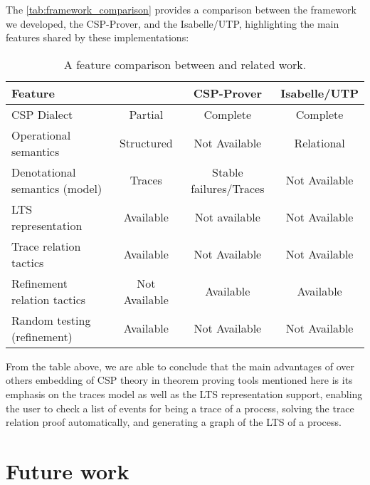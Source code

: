 The \autoref{tab:framework_comparison} provides a comparison between the framework we developed, the CSP-Prover, and the Isabelle/UTP, highlighting the main features shared by these implementations:

\begin{table}[htb]
	\begin{center}
		\caption[A feature comparison between \CSPcoq{} and related work]{A feature comparison between \CSPcoq{} and related work.}
		\label{tab:framework_comparison}
		\begin{tabular}{ |l|c|c|c| }
			\hline
			Feature & \CSPcoq{} & CSP-Prover & Isabelle/UTP \\
			\hline
			CSP Dialect & Partial & Complete & Complete \\ [0.5ex]
			Operational semantics & Structured & Not Available & Relational \\ [0.5ex]
			Denotational semantics (model) & Traces & Stable failures/Traces & Not Available \\ [0.5ex]
			LTS representation & Available & Not available & Not Available \\ [0.5ex]
			Trace relation tactics & Available & Not Available & Not Available \\ [0.5ex]
			Refinement relation tactics & Not Available & Available & Available \\ [0.5ex]
			Random testing (refinement) & Available & Not Available & Not Available \\ [0.5ex]
			\hline
		\end{tabular}
	\end{center}
\end{table}

From the table above, we are able to conclude that the main advantages of \CSPcoq{} over others embedding of CSP theory in theorem proving tools mentioned here is its emphasis on the traces model as well as the LTS representation support, enabling the user to check a list of events for being a trace of a process, solving the trace relation proof automatically, and generating a graph of the LTS of a process.

\section{Future work}

